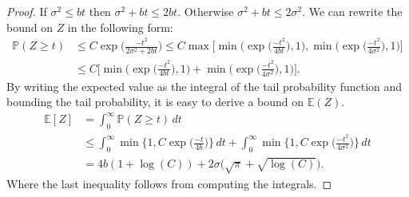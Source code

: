 \documentclass[]{article}
\newcommand{\E}{\mathbb{E}}
\newcommand{\Prob}{\mathbb{P}}
\begin{document}
\begin{proof}
	If $\sigma^2 \leq bt$ then $\sigma^2 + bt \leq 2bt$. Otherwise $\sigma^2 + bt \leq 2\sigma^2$. We can rewrite the bound on $Z$ in the following form:
	\begin{align}
	\Prob(Z \geq t) &\leq C \exp\Big(\frac{-t^2}{2\sigma^2 + 2bt}\Big) \leq 				
	C\max\Big[\min\Big(\exp\big(\frac{-t^2}{4bt}\big),1\Big), \min\Big(\exp\big(\frac{-t^2}{4\sigma^2}\big),1\Big)	
	\Big]\\		
	&\leq C \Big[
	\min\Big(\exp\big(\frac{-t^2}{4bt}\big),1\Big) +  \min\Big(\exp\big(\frac{-t^2}{4\sigma^2}\big),1\Big)	
	\Big].
	\end{align}
	By writing the expected value as the integral of the tail probability function and bounding the tail probability, it is easy to derive a bound on $\E(Z)$.		
	\begin{align}
	\E[Z] &= \int_{0}^{\infty}\Prob(Z \geq t) \, dt\\ 
	&\leq  \int_{0}^{\infty}\min\Big\{1, C\exp\big(\frac{-t}{4b}\big)\Big\} \, dt +
	\int_{0}^{\infty} \min\Big\{1, C\exp\big(\frac{-t^2}{4\sigma^2}\big)\Big\} \, dt\\
	&= 4b(1 + \log(C)) + 2\sigma \big(\sqrt{\pi} + \sqrt{\log(C)}\big).
	\end{align}
	Where the last inequality follows from computing the integrals.
\end{proof}




\end{document}
